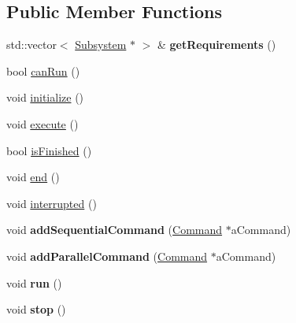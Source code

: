 \subsection*{Public Member Functions}
\begin{DoxyCompactItemize}
\item 
\mbox{\label{classlib_iterative_robot_1_1_command_group_abf3d539920648f9dec9dfdef30699c82}} 
std\+::vector$<$ \mbox{\hyperlink{classlib_iterative_robot_1_1_subsystem}{Subsystem}} $\ast$ $>$ \& {\bfseries get\+Requirements} ()
\item 
bool \mbox{\hyperlink{classlib_iterative_robot_1_1_command_group_abd75c9b52e6b4ae5af1b6724e865311f}{can\+Run}} ()
\item 
void \mbox{\hyperlink{classlib_iterative_robot_1_1_command_group_a99800c5dbd05ab750aa0bb27518d0467}{initialize}} ()
\item 
void \mbox{\hyperlink{classlib_iterative_robot_1_1_command_group_a5e91d370cafde43548d79945ccb4d8fe}{execute}} ()
\item 
bool \mbox{\hyperlink{classlib_iterative_robot_1_1_command_group_a96807a2763adf9e21ebf2cb9e3574e3c}{is\+Finished}} ()
\item 
void \mbox{\hyperlink{classlib_iterative_robot_1_1_command_group_a28ad3a1c2f6b4f9aea10efa1a824895e}{end}} ()
\item 
void \mbox{\hyperlink{classlib_iterative_robot_1_1_command_group_a5174a8e63675bead12b84e39df0ae90e}{interrupted}} ()
\item 
\mbox{\label{classlib_iterative_robot_1_1_command_group_ae6cdd735460cf917243bdbfe451b651a}} 
void {\bfseries add\+Sequential\+Command} (\mbox{\hyperlink{classlib_iterative_robot_1_1_command}{Command}} $\ast$a\+Command)
\item 
\mbox{\label{classlib_iterative_robot_1_1_command_group_a339c87cb07c043b8f4fe6b29b4c46171}} 
void {\bfseries add\+Parallel\+Command} (\mbox{\hyperlink{classlib_iterative_robot_1_1_command}{Command}} $\ast$a\+Command)
\item 
\mbox{\label{classlib_iterative_robot_1_1_command_group_a9e76c6d0ef039eca4dc27dd2f0144485}} 
void {\bfseries run} ()
\item 
\mbox{\label{classlib_iterative_robot_1_1_command_group_ad521849c9a7f1b3f952b318ee424c5b9}} 
void {\bfseries stop} ()
\end{DoxyCompactItemize}
